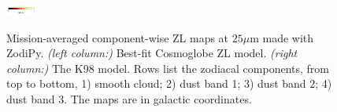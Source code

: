 \documentclass[twocolumn]{aa}
\begin{document}
\begin{figure}[hbt]
{    \includegraphics[width=1cm,angle=90]{figs/comp_maps/cbar_3.pdf}%
    }\\
    \caption{Mission-averaged component-wise ZL maps at $25\mu$m made with ZodiPy. 
    \textit{(left column:)} Best-fit Cosmoglobe ZL model. \textit{(right column:)} The K98 model.
    Rows list the zodiacal components, from top to bottom, 1) smooth cloud; 2) dust band 1; 3) 
    dust band 2; 4) dust band 3. The maps are in galactic coordinates.}
    \label{fig:mission-averaged-comp-maps}
\end{figure}

\begin{figure}
    \centering
    \\
    \\
\end{figure}
\end{document}
